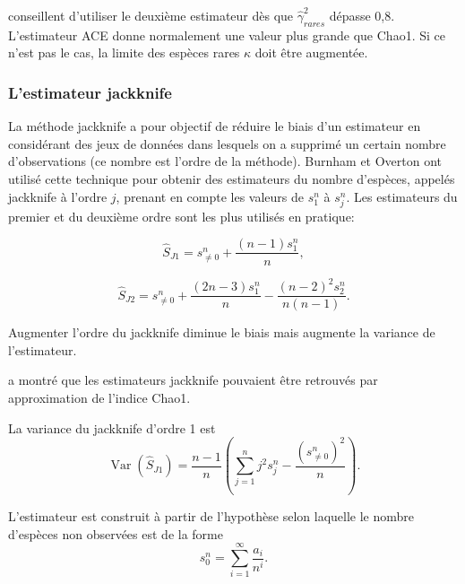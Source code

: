 \documentclass[
  11pt,
  french,
  a4paper,
  extrafontsizes,onecolumn,openright
  ]{memoir}
\begin{document}
\textcite{Chao2010a} conseillent d'utiliser le deuxième estimateur dès que \({\widehat{\gamma}}^2_\mathit{rares}\) dépasse 0,8.
L'estimateur ACE donne normalement une valeur plus grande que Chao1.
Si ce n'est pas le cas, la limite des espèces rares \(\kappa\) doit être augmentée.

\hypertarget{lestimateur-jackknife}{%
\subsubsection{L'estimateur jackknife}\label{lestimateur-jackknife}}

La méthode jackknife a pour objectif de réduire le biais d'un estimateur en considérant des jeux de données dans lesquels on a supprimé un certain nombre d'observations (ce nombre est l'ordre de la méthode).
Burnham et Overton \autocite*{Burnham1978,Burnham1979} ont utilisé cette technique pour obtenir des estimateurs du nombre d'espèces, appelés jackknife à l'ordre \(j\), prenant en compte les valeurs de \(s^{n}_{1}\) à \(s^{n}_{j}\).
Les estimateurs du premier et du deuxième ordre sont les plus utilisés en pratique:

\begin{equation}
  \label{eq:Jack1}
  \hat{S}_\mathit{J1} = {s^{n}_{\ne 0}} + \frac{\left(n-1\right){s^{n}_{1}}}{n},
\end{equation}

\begin{equation} 
  \label{eq:Jack2}
  \hat{S}_\mathit{J2} = {s^{n}_{\ne 0}} + \frac{\left(2n-3\right){s^{n}_{1}}}{n} - \frac{{\left(n-2\right)}^{2}s^{n}_{2}}{n\left(n-1\right)}.
\end{equation}

Augmenter l'ordre du jackknife diminue le biais mais augmente la variance de l'estimateur.

\textcite{Chao1984} a montré que les estimateurs jackknife pouvaient être retrouvés par approximation de l'indice Chao1.

La variance du jackknife d'ordre 1 est \autocite{Heltshe1983}
\begin{equation} 
  \label{eq:VarJack1}
  \operatorname{Var}{\left( \hat{S}_\mathit{J1} \right)}
  = \frac{n-1}{n} \left( \sum_{j=1}^{n}{j^2 s^{n}_{j}} - \frac{\left( s^{n}_{\ne 0} \right)^2}{n} \right).
\end{equation}

L'estimateur est construit à partir de l'hypothèse selon laquelle le nombre d'espèces non observées est de la forme
\[s^{n}_{0} = \sum_{i=1}^{\infty}{\frac{a_i}{n^i}}.\]
\end{document}
